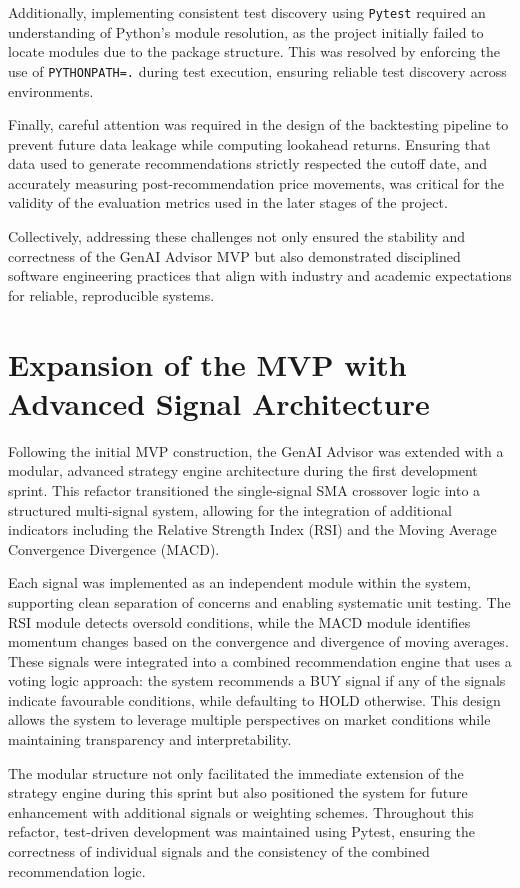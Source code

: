 Additionally, implementing consistent test discovery using \texttt{Pytest} required an understanding of Python's module resolution, as the project initially failed to locate modules due to the package structure. This was resolved by enforcing the use of \texttt{PYTHONPATH=.} during test execution, ensuring reliable test discovery across environments.

Finally, careful attention was required in the design of the backtesting pipeline to prevent future data leakage while computing lookahead returns. Ensuring that data used to generate recommendations strictly respected the cutoff date, and accurately measuring post-recommendation price movements, was critical for the validity of the evaluation metrics used in the later stages of the project.

Collectively, addressing these challenges not only ensured the stability and correctness of the GenAI Advisor MVP but also demonstrated disciplined software engineering practices that align with industry and academic expectations for reliable, reproducible systems.

\section{Expansion of the MVP with Advanced Signal Architecture}

Following the initial MVP construction, the GenAI Advisor was extended with a modular, advanced strategy engine architecture during the first development sprint. This refactor transitioned the single-signal SMA crossover logic into a structured multi-signal system, allowing for the integration of additional indicators including the Relative Strength Index (RSI) and the Moving Average Convergence Divergence (MACD).

Each signal was implemented as an independent module within the system, supporting clean separation of concerns and enabling systematic unit testing. The RSI module detects oversold conditions, while the MACD module identifies momentum changes based on the convergence and divergence of moving averages. These signals were integrated into a combined recommendation engine that uses a voting logic approach: the system recommends a BUY signal if any of the signals indicate favourable conditions, while defaulting to HOLD otherwise. This design allows the system to leverage multiple perspectives on market conditions while maintaining transparency and interpretability.

The modular structure not only facilitated the immediate extension of the strategy engine during this sprint but also positioned the system for future enhancement with additional signals or weighting schemes. Throughout this refactor, test-driven development was maintained using Pytest, ensuring the correctness of individual signals and the consistency of the combined recommendation logic.

